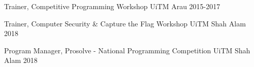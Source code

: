 

\begin{cvhonors}

  \cvhonor
    {Trainer,} %
    {Competitive Programming Workshop} %
    {UiTM Arau} %
    {2015-2017} %

  \cvhonor
    {Trainer,} %
    {Computer Security \& Capture the Flag Workshop} %
    {UiTM Shah Alam} %
    {2018} %

  \cvhonor
    {Program Manager,} %
    {Prosolve - National Programming Competition} %
    {UiTM Shah Alam} %
    {2018} %

\end{cvhonors}
